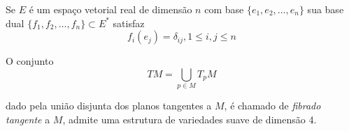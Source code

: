 \begin{lembrete}
	Se $E$ é um espaço vetorial real de dimensão $n$ com base $\{ e_1, e_2, \ldots, e_n \}$ sua base dual $\{ f_1, f_2, \ldots, f_n \} \subset E^*$ satisfaz
	\begin{equation*}
		f_i (e_j) = \delta_{ij}, 1 \leq i,j \leq n
	\end{equation*}
\end{lembrete}

	O conjunto
	\begin{equation*}
		TM = \bigcup_{p \in M} T_p M
	\end{equation*}
	
	dado pela união disjunta dos planos tangentes a $M$, é chamado de \emph{fibrado tangente} a $M$, admite uma estrutura de variedades suave de dimensão 4.